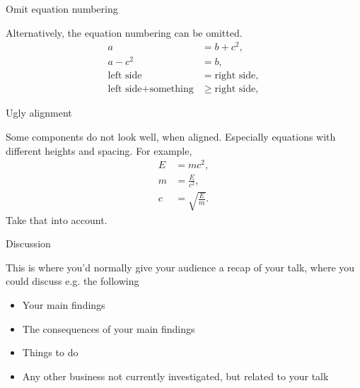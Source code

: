 \documentclass[11pt]{beamer}
\begin{document}
\begin{frame}{Omit equation numbering}

Alternatively, the equation numbering can be omitted.
\begin{align*}
a &= b + c^2, \\
a - c^2 &= b, \\
\text{left side} &= \text{right side}, \\
\text{left side} + \text{something} &\geq \text{right side}, 
\end{align*}

\end{frame}

\begin{frame}{Ugly alignment}

Some components do not look well, when aligned. Especially equations with different heights and spacing. For example,
\begin{align}
E &= m c^2, \\
m &= \frac{E}{c^2}, \\
c &= \sqrt{\frac{E}{m}}. 
\end{align}
Take that into account.

\end{frame}

\begin{frame}{Discussion}

This is where you'd normally give your audience a recap of your talk, where you could discuss e.g. the following
\begin{itemize}
  \item Your main findings
  \item The consequences of your main findings
  \item Things to do
  \item Any other business not currently investigated, but related to your talk
\end{itemize}

\end{frame}
\end{document}
